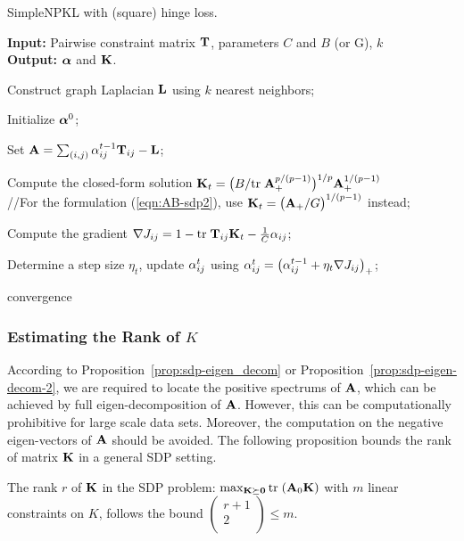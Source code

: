 \begin{algorithm}[htbp]
\caption{SimpleNPKL with (square) hinge loss.}
\textbf{Input:} Pairwise constraint matrix ${\bf T}$, parameters $C$ and $B$ (or G), $k$\\
\textbf{Output:} ${\boldsymbol{\alpha}}$ and ${\bf K}$.
\begin{algorithmic}
[1] \STATE Construct graph Laplacian ${\bf L}$ using $k$ nearest neighbors;

\STATE Initialize ${\boldsymbol{\alpha}}^0$;

\REPEAT

\STATE Set ${\bf A}=\sum_{(i,j)} {\alpha}_{ij}^{t-1} {\bf T}_{ij} - {\bf L}$;

\STATE Compute the closed-form solution ${\bf K}_t = \big(B / {\mbox{tr}\;} {\bf A}_+^{p/(p -
1)}\big)^{1/p} {\bf A}_+^{1 / (p - 1)}$\\ //For the formulation (\ref{eqn:AB-sdp2}), use
${\bf K}_t = \big({\bf A}_+ / G\big)^{1 / (p - 1)}$ instead;

\STATE Compute the gradient $\nabla J_{ij} = 1 - {\mbox{tr}\;} {\bf T}_{ij}{\bf K}_t -
\frac{1}{C}{\alpha}_{ij}$;

\STATE Determine a step size $\eta_t$, update ${\alpha}_{ij}^t$ using ${\alpha}_{ij}^t = \big({\alpha}_{ij}^{t-1}
+ \eta_t \nabla J_{ij} \big)_+$;

\UNTIL convergence
\end{algorithmic}
\label{alg:iterative-npk}
\end{algorithm}

\subsubsection{Estimating the Rank of $K$}\label{sec:rank}

According to Proposition~\ref{prop:sdp-eigen_decom} or  Proposition~\ref{prop:sdp-eigen-decom-2}, we are required to locate the positive
spectrums of ${\bf A}$, which can be achieved by full eigen-decomposition of ${\bf A}$.
However, this can be computationally prohibitive for large scale data sets. Moreover, the computation on the negative  eigen-vectors of ${\bf A}$ should be avoided. The following proposition \cite{tr/Pataki95} bounds the rank of matrix ${\bf K}$ in a general SDP setting.

\begin{prop}\label{prop:low_rank}
The rank $r$ of ${\bf K}$ in the SDP problem: $\max_{{\bf K}{\succeq{\bf 0}}} {\mbox{tr}\;}({\bf A}_0{\bf K})$ with $m$
linear constraints on $K$, follows the bound $ \left(
                     \begin{array}{c}
                       r  +1 \\
                       2 \\
                     \end{array}
                   \right)\leq m $.
\end{prop}


